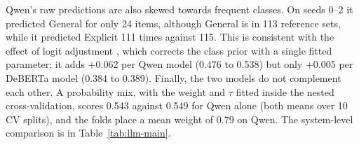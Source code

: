 Qwen's raw predictions are also skewed towards frequent classes. On seeds 0--2 it predicted
General for only 24 items, although General is in 113 reference sets, while it predicted
Explicit 111 times against 115. This is consistent with the effect of logit adjustment
\citep{menon2021longtail}, which corrects the class prior with a single fitted parameter:
it adds +0.062 per Qwen model (0.476 to 0.538) but only +0.005 per DeBERTa model (0.384 to
0.389). Finally, the two models do not complement each other. A probability mix, with the
weight and $\tau$ fitted inside the nested cross-validation, scores 0.543 against 0.549 for
Qwen alone (both means over 10 CV splits), and the folds place a mean weight of 0.79 on
Qwen. The system-level comparison is in Table~\ref{tab:llm-main}.
